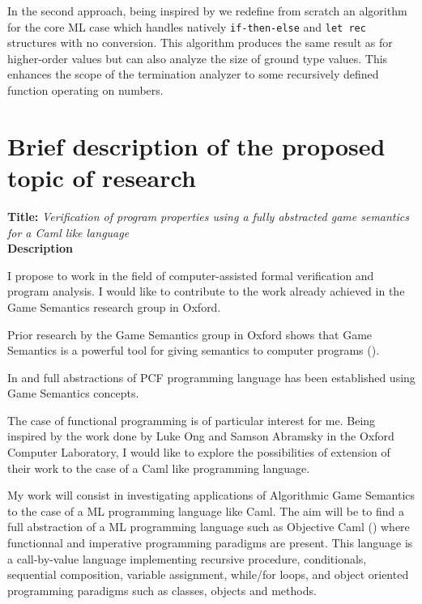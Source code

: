\documentclass{article}
\begin{document}
\noindent In the second approach, being inspired by \cite{jones04}
we redefine from scratch an algorithm for the core ML case which
handles natively {\tt if-then-else} and {\tt let rec} structures
with no conversion. This algorithm produces the same result as
\cite{jones04} for higher-order values but can also analyze the size
of ground type values. This enhances the scope of the termination
analyzer to some recursively defined function operating on numbers.
\\


\pagebreak

\section*{Brief description of the proposed topic of research}

\textbf{Title:}
\textsl{Verification of program properties using a fully abstracted game semantics for a Caml like language}
\\


\noindent \textbf{Description}

I propose to work in the field of computer-assisted formal verification and program analysis.
I would like to contribute to the work already achieved in the Game Semantics research group in Oxford.

Prior research by the Game Semantics group in Oxford shows that Game Semantics is a powerful tool for giving semantics to computer programs (\cite{abram01}).

In \cite{abr00} and \cite{ong00} full abstractions of PCF programming language has been established using  Game Semantics concepts.

The case of functional programming is of particular interest for me. Being inspired by the work done by Luke Ong and Samson Abramsky in the Oxford Computer Laboratory, I would like to explore the possibilities of extension of their work to the case of a Caml like programming language. 

My work will consist in investigating applications of Algorithmic Game Semantics to the case of a ML programming language like Caml.
\textsl{}
The aim will be to find a full abstraction of a ML programming language such as Objective Caml (\cite{ocaml}) where functionnal and imperative programming paradigms are present.
This language is a call-by-value language implementing recursive procedure, conditionals, sequential composition, variable assignment, while/for loops, and object oriented programming paradigms such as classes, objects and methods.
\end{document}
